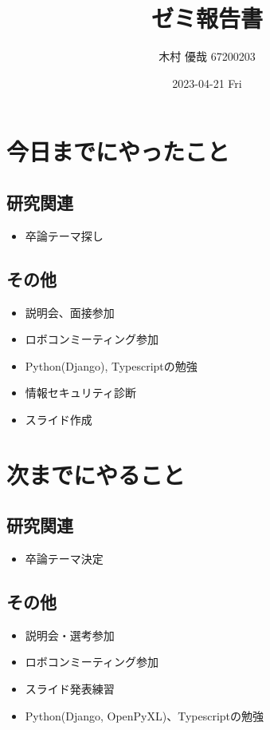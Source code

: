 \documentclass[uplatex, onecolumn, 10pt]{jsarticle}
\begin{document}
\title{\vspace{-40mm}\bf{\LARGE{ゼミ報告書}}}
\author{\vspace{-40mm}木村 優哉 67200203}
\date{2023-04-21 Fri}
\maketitle


\section{今日までにやったこと}

\subsection*{研究関連}
\begin{itemize}
	\item 卒論テーマ探し
\end{itemize}

\subsection*{その他}
\begin{itemize}
	\item 説明会、面接参加
	\item ロボコンミーティング参加
	\item Python(Django), Typescriptの勉強
	\item 情報セキュリティ診断
	\item スライド作成
\end{itemize}


\section{次までにやること}

\subsection*{研究関連}
\begin{itemize}
	\item 卒論テーマ決定
\end{itemize}

\subsection*{その他}
\begin{itemize}
	\item 説明会・選考参加
	\item ロボコンミーティング参加
	\item スライド発表練習
	\item Python(Django, OpenPyXL)、Typescriptの勉強
\end{itemize}
\end{document}
